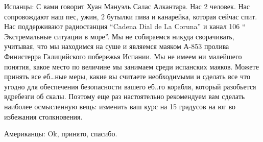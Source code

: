 Испанцы: С вами говорит Хуан Мануэль Салас Алкантара. Нас 2 человек. Нас
сопровождают наш пес, ужин, 2 бутылки пива и канарейка, которая сейчас спит.
Нас поддерживают радиостанция \enquote{Cadena Dial de La Coruna} и канал 106 \enquote{
Экстремальные ситуации в море}. Мы не собираемся никуда сворачивать, учитывая,
что мы находимся на суше и являемся маяком А-853 пролива Финистерра
Галицийского побережья Испании. Мы не имеем ни малейшего понятия, какое место
по величине мы занимаем среди испанских маяков. Можете принять все еб…ные меры,
какие вы считаете необходимыми и сделать все что угодно для обеспечения
безопасности вашего еб..го корабля, который разобьется вдребезги об скалы.
Поэтому еще раз настоятельно рекомендуем вам сделать наиболее осмысленную вещь:
изменить ваш курс на 15 градусов на юг во избежания столкновения.

Американцы: Ok, принято, спасибо.
